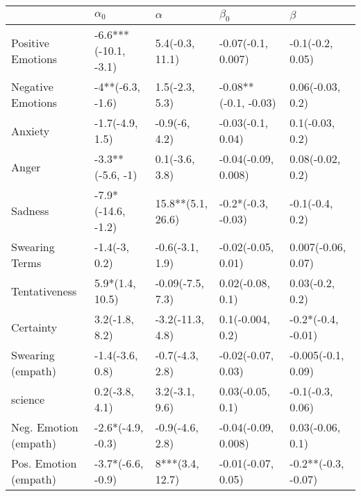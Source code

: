 \begin{tabular}{lllll}
\toprule
{} &            $\alpha_0$ &           $\alpha$ &             $\beta_0$ &              $\beta$ \\
\midrule
Positive Emotions     &  -6.6***(-10.1, -3.1) &    5.4(-0.3, 11.1) &    -0.07(-0.1, 0.007) &     -0.1(-0.2, 0.05) \\
Negative Emotions     &      -4**(-6.3, -1.6) &     1.5(-2.3, 5.3) &  -0.08**(-0.1, -0.03) &     0.06(-0.03, 0.2) \\
Anxiety               &       -1.7(-4.9, 1.5) &      -0.9(-6, 4.2) &     -0.03(-0.1, 0.04) &      0.1(-0.03, 0.2) \\
Anger                 &      -3.3**(-5.6, -1) &     0.1(-3.6, 3.8) &   -0.04(-0.09, 0.008) &     0.08(-0.02, 0.2) \\
Sadness               &    -7.9*(-14.6, -1.2) &  15.8**(5.1, 26.6) &    -0.2*(-0.3, -0.03) &      -0.1(-0.4, 0.2) \\
Swearing Terms        &         -1.4(-3, 0.2) &    -0.6(-3.1, 1.9) &    -0.02(-0.05, 0.01) &   0.007(-0.06, 0.07) \\
Tentativeness         &       5.9*(1.4, 10.5) &   -0.09(-7.5, 7.3) &      0.02(-0.08, 0.1) &      0.03(-0.2, 0.2) \\
Certainty             &        3.2(-1.8, 8.2) &   -3.2(-11.3, 4.8) &      0.1(-0.004, 0.2) &   -0.2*(-0.4, -0.01) \\
Swearing (empath)     &       -1.4(-3.6, 0.8) &    -0.7(-4.3, 2.8) &    -0.02(-0.07, 0.03) &   -0.005(-0.1, 0.09) \\
science               &        0.2(-3.8, 4.1) &     3.2(-3.1, 9.6) &      0.03(-0.05, 0.1) &     -0.1(-0.3, 0.06) \\
Neg. Emotion (empath) &     -2.6*(-4.9, -0.3) &    -0.9(-4.6, 2.8) &   -0.04(-0.09, 0.008) &     0.03(-0.06, 0.1) \\
Pos. Emotion (empath) &     -3.7*(-6.6, -0.9) &    8***(3.4, 12.7) &    -0.01(-0.07, 0.05) &  -0.2**(-0.3, -0.07) \\
\bottomrule
\end{tabular}
